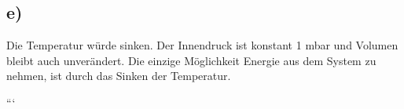 

\subsection*{e)}

Die Temperatur würde sinken. Der Innendruck ist konstant 1 mbar und Volumen bleibt auch unverändert. Die einzige Möglichkeit Energie aus dem System zu nehmen, ist durch das Sinken der Temperatur.

```